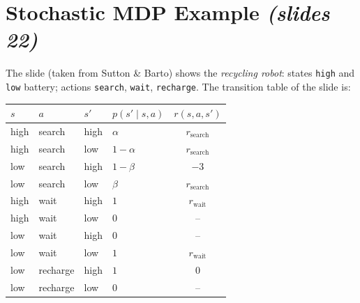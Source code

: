 \documentclass[11pt,a4paper]{article}
\newcommand{\slr}[1]{\texorpdfstring{\emph{(slides #1)}}{(slides #1)}}
\theoremstyle{plain}
\theoremstyle{definition}
\theoremstyle{remark}
\begin{document}
\section{Stochastic MDP Example \slr{22}}
The slide (taken from Sutton \& Barto) shows the \emph{recycling robot}: states \texttt{high} and \texttt{low} battery; actions \texttt{search}, \texttt{wait}, \texttt{recharge}. The transition table of the slide is:
\begin{center}
\renewcommand{\arraystretch}{1.15}
\begin{tabular}{llllc}
\toprule
$s$ & $a$ & $s'$ & $p(s'\mid s,a)$ & $r(s,a,s')$\\
\midrule
high & search   & high & $\alpha$   & $r_{\text{search}}$\\
high & search   & low  & $1-\alpha$ & $r_{\text{search}}$\\
low  & search   & high & $1-\beta$  & $-3$\\
low  & search   & low  & $\beta$    & $r_{\text{search}}$\\
high & wait     & high & $1$        & $r_{\text{wait}}$\\
high & wait     & low  & $0$        & --\\
low  & wait     & high & $0$        & --\\
low  & wait     & low  & $1$        & $r_{\text{wait}}$\\
low  & recharge & high & $1$        & $0$\\
low  & recharge & low  & $0$        & --\\
\bottomrule
\end{tabular}
\end{center}
\end{document}
